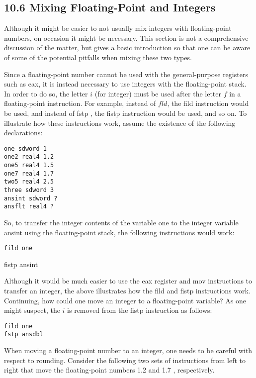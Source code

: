\documentclass[10pt]{article}
\begin{document}
\subsection*{10.6 Mixing Floating-Point and Integers}
Although it might be easier to not usually mix integers with floating-point numbers, on occasion it might be necessary. This section is not a comprehensive discussion of the matter, but gives a basic introduction so that one can be aware of some of the potential pitfalls when mixing these two types.

Since a floating-point number cannot be used with the general-purpose registers such as eax, it is instead necessary to use integers with the floating-point stack. In order to do so, the letter $i$ (for integer) must be used after the letter $f$ in a floating-point instruction. For example, instead of $f l d$, the fild instruction would be used, and instead of fstp , the fistp instruction would be used, and so on. To illustrate how these instructions work, assume the existence of the following declarations:

\begin{verbatim}
one sdword 1
one2 real4 1.2
one5 real4 1.5
one7 real4 1.7
two5 real4 2.5
three sdword 3
ansint sdword ?
ansflt real4 ?
\end{verbatim}

So, to transfer the integer contents of the variable one to the integer variable ansint using the floating-point stack, the following instructions would work:

\begin{verbatim}
fild one
\end{verbatim}

fistp ansint

Although it would be much easier to use the eax register and mov instructions to transfer an integer, the above illustrates how the fild and fistp instructions work. Continuing, how could one move an integer to a floating-point variable? As one might suspect, the $i$ is removed from the fistp instruction as follows:

\begin{verbatim}
fild one
fstp ansdbl
\end{verbatim}

When moving a floating-point number to an integer, one needs to be careful with respect to rounding. Consider the following two sets of instructions from left to right that move the floating-point numbers 1.2 and 1.7 , respectively.
\end{document}
